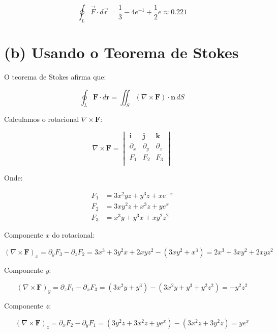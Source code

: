 \documentclass[a4paper,12pt]{article}
\begin{document}
\begin{flushleft}
\begin{equation}
\boxed{
\oint_L \vec{F} \cdot d\vec{r} = \frac{1}{3} - 4e^{-1} + \frac{1}{2}e \approx 0.221
}
\end{equation}

\section*{(b) Usando o Teorema de Stokes}

O teorema de Stokes afirma que:

\begin{equation}
\oint_L \mathbf{F} \cdot d\mathbf{r} = \iint_S (\nabla \times \mathbf{F}) \cdot \mathbf{n} \, dS
\end{equation}

Calculamos o rotacional $\nabla \times \mathbf{F}$:

\[
\nabla \times \mathbf{F} = 
\begin{vmatrix}
\mathbf{i} & \mathbf{j} & \mathbf{k} \\
\partial_x & \partial_y & \partial_z \\
F_1 & F_2 & F_3 \\
\end{vmatrix}
\]

Onde:

\begin{align}
F_1 &= 3x^2 y z + y^3 z + x e^{-x} \\
F_2 &= 3x y^2 z + x^3 z + y e^x \\
F_3 &= x^3 y + y^3 x + x y^2 z^2
\end{align}

Componente $x$ do rotacional:

\begin{equation}
(\nabla \times \mathbf{F})_x = \partial_y F_3 - \partial_z F_2 = 3x^3 + 3y^2 x + 2x y z^2 - (3x y^2 + x^3) = 2x^3 + 3x y^2 + 2x y z^2
\end{equation}

Componente $y$:

\begin{equation}
(\nabla \times \mathbf{F})_y = \partial_z F_1 - \partial_x F_3 = (3x^2 y + y^3) - (3x^2 y + y^3 + y^2 z^2) = -y^2 z^2
\end{equation}

Componente $z$:

\begin{equation}
(\nabla \times \mathbf{F})_z = \partial_x F_2 - \partial_y F_1 = (3y^2 z + 3x^2 z + y e^x) - (3x^2 z + 3y^2 z) = y e^x
\end{equation}


\end{flushleft}
\end{document}
